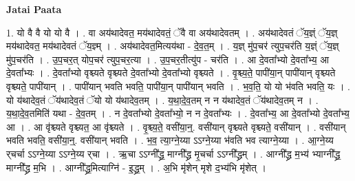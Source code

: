 \documentclass[17pt]{extarticle}
\begin{document}
\textbf{Jatai Paata} \newline

1. यो वै वै यो यो वै । . वा अय॑थादेवत॒ मय॑थादेवतं॒ ॅवै वा अय॑थादेवतम् । . अय॑थादेवतं ॅय॒ज्ञ्ं ॅय॒ज्ञ् मय॑थादेवत॒ मय॑थादेवतं ॅय॒ज्ञ्म् । . अय॑थादेवत॒मित्यय॑था - दे॒व॒त॒म् । . य॒ज्ञ् मु॑प॒चर॑ त्युप॒चर॑ति य॒ज्ञ्ं ॅय॒ज्ञ् मु॑प॒चर॑ति । . उ॒प॒चर॒त् योप॒चर॑ त्युप॒चर॒त्या । . उ॒प॒चर॒तीत्यु॑प - चर॑ति । . आ दे॒वता᳚भ्यो दे॒वता᳚भ्य॒ आ दे॒वता᳚भ्यः । . दे॒वता᳚भ्यो वृश्च्यते वृश्च्यते दे॒वता᳚भ्यो दे॒वता᳚भ्यो वृश्च्यते । . वृ॒श्च्य॒ते॒ पापी॑या॒न् पापी॑यान् वृश्च्यते वृश्च्यते॒ पापी॑यान् । . पापी॑यान् भवति भवति॒ पापी॑या॒न् पापी॑यान् भवति । . भ॒व॒ति॒ यो यो भ॑वति भवति॒ यः । . यो य॑थादेव॒तं ॅय॑थादेव॒तं ॅयो यो य॑थादेव॒तम् । . य॒था॒दे॒व॒तम् न न य॑थादेव॒तं ॅय॑थादेव॒तम् न । . य॒था॒दे॒व॒तमिति॑ यथा - दे॒व॒तम् । . न दे॒वता᳚भ्यो दे॒वता᳚भ्यो॒ न न दे॒वता᳚भ्यः । . दे॒वता᳚भ्य॒ आ दे॒वता᳚भ्यो दे॒वता᳚भ्य॒ आ । . आ वृ॑श्च्यते वृश्च्यत॒ आ वृ॑श्च्यते । . वृ॒श्च्य॒ते॒ वसी॑या॒न्॒. वसी॑यान् वृश्च्यते वृश्च्यते॒ वसी॑यान् । . वसी॑यान् भवति भवति॒ वसी॑या॒न्॒. वसी॑यान् भवति । . भ॒व॒ त्या॒ग्ने॒य्या ऽऽग्ने॒य्या भ॑वति भव त्याग्ने॒य्या । . आ॒ग्ने॒य्य र्‌चर्चा ऽऽग्ने॒य्या ऽऽग्ने॒य्य र्‌चा । . ऋ॒चा ऽऽग्नी᳚द्ध्र॒ माग्नी᳚द्ध्र मृ॒चर्चा ऽऽग्नी᳚द्ध्रम् । . आग्नी᳚द्ध्र म॒भ्य॑ भ्याग्नी᳚द्ध्र॒ माग्नी᳚द्ध्र म॒भि । . आग्नी᳚द्ध्र॒मित्याग्नि॑ - इ॒द्ध्र॒म् । . अ॒भि मृ॑शेन् मृशे द॒भ्य॑भि मृ॑शेत् । \newline
\end{document}

